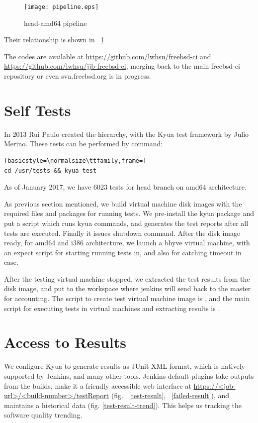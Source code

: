 \documentclass[a4paper,twocolumn,10pt]{article}
\begin{document}
\begin{figure}
\texttt{[image: pipeline.eps]}
\caption{head-amd64 pipeline}
\label{pipeline}
\end{figure}

Their relationship is shown in ~\ref{pipeline}

The codes are available at \url{https://github.com/lwhsu/freebsd-ci} and
\url{https://github.com/lwhsu/jjb-freebsd-ci}, merging back to the main
freebsd-ci repository or even svn.freebsd.org is in progress.

\section{Self Tests}

In 2013 Rui Paulo created the  hierarchy, with the Kyua test
framework by Julio Merino. These tests can be performed by command:
\begin{lstlisting}[basicstyle=\normalsize\ttfamily,frame=]
cd /usr/tests && kyua test
\end{lstlisting}
As of January 2017, we have 6023 tests for head branch on amd64 architecture.

As previous section mentioned, we build virtual machine disk images with the
required files and packages for running tests. We pre-install the kyua package
and put a script which runs kyua commands, and generates the test reports after
all tests are executed. Finally it issues shutdown command. After the disk
image ready, for amd64 and i386 architecture, we launch a bhyve virtual
machine, with an expect script for starting running tests in, and also for
catching timeout in case.

After the testing virtual machine stopped, we extracted the test results from
the disk image, and put to the workspace where jenkins will send back to the
master for accounting. The script to create test virtual machine image is
, and the main script for executing
tests in virtual machines and extracting results is
.

\section{Access to Results}

We configure Kyua to generate results as JUnit XML format, which is natively
supported by Jenkins, and many other tools. Jenkins default plugins take
outputs from the builds, make it a friendly accessible web interface at
\url{https://<job-url>/<build-number>/testReport} (fig. ~\ref{test-result},
~\ref{failed-result}), and maintains a historical data (fig.
\ref{test-result-trend}). This helps us tracking the software quality trending.
\end{document}
